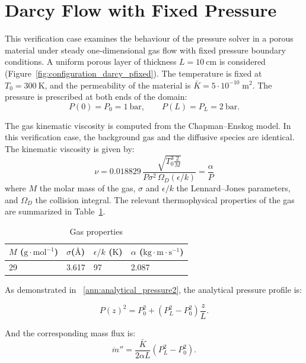 \documentclass[12pt]{article}
\begin{document}
\fi


\section{Darcy Flow with Fixed Pressure}
\label{Darcy_pfixed}

This verification case examines the behaviour of the pressure solver in a porous material under steady one-dimensional gas flow with fixed pressure boundary conditions.  
A uniform porous layer of thickness $L = 10~\mathrm{cm}$ is considered (Figure~\ref{fig:configuration_darcy_pfixed}).  
The temperature is fixed at $T_0 = 300~\mathrm{K}$, and the permeability of the material is $\bar{K} = 5\cdot 10^{-10} \; \mathrm{m^{2}}$. The pressure is prescribed at both ends of the domain:
\[
P(0) = P_0 = 1~\mathrm{bar}, 
\qquad 
P(L) = P_L = 2~\mathrm{bar}.
\]

The gas kinematic viscosity is computed from the Chapman--Enskog model. In this verification case, the background gas and the diffusive species are identical.  
The kinematic viscosity is given by:
\begin{equation}
\nu = 0.018829 \, \frac{\sqrt{T_0^3 \frac{2}{M}}}{P\sigma^2 \, \Omega_D(\epsilon/k)} = \frac{\alpha}{P}
\end{equation}
where $M$ the molar mass of the gas, $\sigma$ and $\epsilon/k$ the Lennard--Jones parameters, and $\Omega_D$ the collision integral. The relevant thermophysical properties of the gas are summarized in Table~\ref{tab:properties_darcy_pfied}.


\begin{table}[H]
\centering
\caption{Gas properties}
\label{tab:properties_darcy_pfied}
\begin{tabular}{@{}llll@{}}
\toprule
$M$ ($\mathrm{g\cdot mol^{-1}}$) & $\sigma$($\mathrm{Å}$) & $\epsilon/k$ ($\mathrm{K}$) & $\alpha$ ($\mathrm{kg \cdot m \cdot s^{-1} }$)\\
\midrule
29 & 3.617 & 97 & 2.087 \\
\bottomrule
\end{tabular}
\end{table}


As demonstrated in ~\ref{ann:analytical_pressure2}, the analytical pressure profile is:

\begin{equation}
P(z)^2 = P_0^2 + \left(P_L^2 - P_0^2\right) \frac{z}{L}.
\end{equation}

And the corresponding mass flux is:
\begin{equation}
\dot{m}'' = \frac{\bar{K}}{2 \alpha L} \left(P_L^2 - P_0^2\right).
\end{equation}
\end{document}
